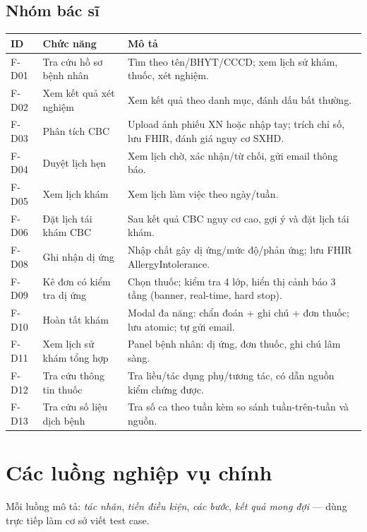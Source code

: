 \documentclass[a4paper,12pt]{article}
\begin{document}
\subsection{Nhóm bác sĩ}
\begin{longtable}{|l|p{4cm}|p{8cm}|}
\hline
\textbf{ID} & \textbf{Chức năng} & \textbf{Mô tả} \\ \hline \endhead
F-D01 & Tra cứu hồ sơ bệnh nhân & Tìm theo tên/BHYT/CCCD; xem lịch sử khám, thuốc, xét nghiệm. \\ \hline
F-D02 & Xem kết quả xét nghiệm & Xem kết quả theo danh mục, đánh dấu bất thường. \\ \hline
F-D03 & Phân tích CBC & Upload ảnh phiếu XN hoặc nhập tay; trích chỉ số, lưu FHIR, đánh giá nguy cơ SXHD. \\ \hline
F-D04 & Duyệt lịch hẹn & Xem lịch chờ, xác nhận/từ chối, gửi email thông báo. \\ \hline
F-D05 & Xem lịch khám & Xem lịch làm việc theo ngày/tuần. \\ \hline
F-D06 & Đặt lịch tái khám CBC & Sau kết quả CBC nguy cơ cao, gợi ý và đặt lịch tái khám. \\ \hline
F-D08 & Ghi nhận dị ứng & Nhập chất gây dị ứng/mức độ/phản ứng; lưu FHIR AllergyIntolerance. \\ \hline
F-D09 & Kê đơn có kiểm tra dị ứng & Chọn thuốc; kiểm tra 4 lớp, hiển thị cảnh báo 3 tầng (banner, real-time, hard stop). \\ \hline
F-D10 & Hoàn tất khám & Modal đa năng: chẩn đoán + ghi chú + đơn thuốc; lưu atomic; tự gửi email. \\ \hline
F-D11 & Xem lịch sử khám tổng hợp & Panel bệnh nhân: dị ứng, đơn thuốc, ghi chú lâm sàng. \\ \hline
F-D12 & Tra cứu thông tin thuốc & Tra liều/tác dụng phụ/tương tác, có dẫn nguồn kiểm chứng được. \\ \hline
F-D13 & Tra cứu số liệu dịch bệnh & Tra số ca theo tuần kèm so sánh tuần-trên-tuần và nguồn. \\ \hline
\end{longtable}

\section{Các luồng nghiệp vụ chính}

Mỗi luồng mô tả: \textit{tác nhân}, \textit{tiền điều kiện}, \textit{các bước}, \textit{kết quả mong đợi} --- dùng trực tiếp làm cơ sở viết test case.
\end{document}

